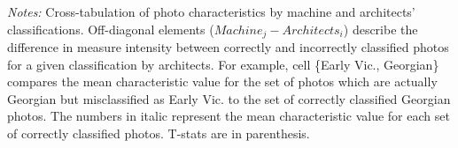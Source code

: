 \documentclass[]{article}
\begin{document}
\begin{table}[!htb]
\begin{tabular}{lrrrrrrr}
\end{tabular} 
 \begin{minipage}{\textwidth} 
\footnotesize 
\vspace{0.25cm}
\emph{Notes:} Cross-tabulation of photo characteristics by machine and architects' classifications. Off-diagonal elements ($Machine_{j}-Architects_{i}$) describe the difference in measure intensity between correctly and incorrectly classified photos for a given classification by architects. For example, cell \{Early Vic., Georgian\} compares the mean characteristic value for the set of photos which are actually Georgian but misclassified as Early Vic. to the set of correctly classified Georgian photos. The numbers in italic represent the mean characteristic value for each set of correctly classified photos. T-stats are in parenthesis.
\end{minipage} 
\endgroup 
\end{table}

\newpage
\clearpage
\end{document}
